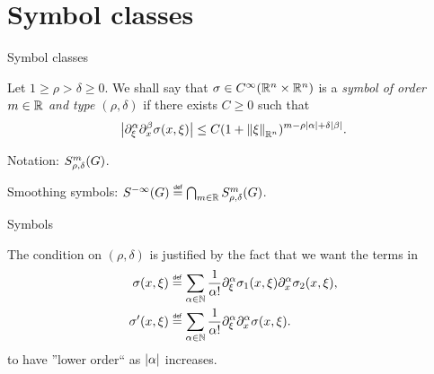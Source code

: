 \documentclass{beamer}
\begin{document}
\section{Symbol classes}

\begin{frame}
    {Symbol classes}

    \begin{definition}

        Let $1 \geq \rho > \delta \geq 0$.
        We shall say that $\sigma \in {C^\infty(\mathbb{R}^n \times \mathbb{R}^n)}$ is a \emph{symbol of order $m \in \mathbb{R}$ and type $(\rho, \delta)$}
        if there exists $C \geq 0$ such that
        \begin{align*}
            \abs {%
                \iD {\xi^\alpha}
                \iD {x^\beta}
                \sigma(x, \xi)
            } \leq
            C (1 + \norm [\R^n] \xi)^{m - \rho \abs \alpha + \delta \abs \beta}.
        \end{align*}

        \pause
        Notation: $S^{m}_{\rho, \delta}(G)$.
    \end{definition}

    \pause
    Smoothing symbols: $\SmoothingSymbols \defeq \bigcap_{m \in \R} \SymbolClass m {\rho, \delta}$.
\end{frame}

\begin{frame}
    {Symbols}

    The condition on $(\rho, \delta)$ is justified by the fact that we want the terms in
    \begin{align}
        \sigma(x, \xi)
        &\defeq
        \sum_{\alpha \in \N}
        \frac 1 {\alpha!}
        \iD {\xi^\alpha} \sigma_1(x, \xi)
        \iD {x^\alpha} \sigma_2(x, \xi),\\
        \sigma'(x, \xi)
        &\defeq
        \sum_{\alpha \in \N}
        \frac 1 {\alpha!}
        \iD {\xi^\alpha}
        \iD {x^\alpha} \sigma(x, \xi).
    \end{align}
    to have ''lower order`` as $\left|{\alpha}\right|$ increases.
\end{frame}
\end{document}
